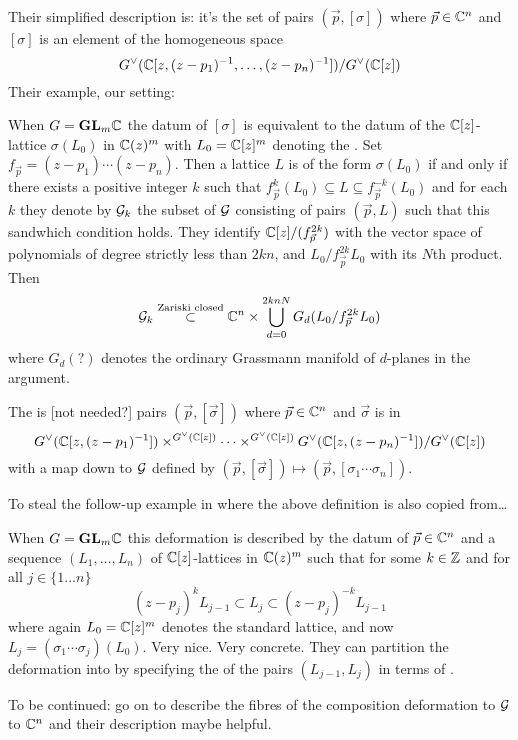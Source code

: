 \documentclass{article}
\begin{document}
Their simplified description is: it's the set of pairs $(\vec p,[\sigma])$ where $\vec p\in\mathbb C^n$ and $[\sigma]$ is an element of the homogeneous space 
\[
G^\vee(\mathbb C[z,(z-p_1)^{-1},\dots,(z-p_n)^{-1}])/G^\vee(\mathbb C[z])    
\]
Their example, our setting: 
\begin{example}
    When $G = {\mathbf{GL}}_m\mathbb C$ the datum of $[\sigma]$ is equivalent to the datum of the $\mathbb C[z]$-lattice $\sigma(L_0)$ in $\mathbb C(z)^m$ with $L_0 = \mathbb C[z]^m$ denoting the . Set $f_{\vec p} = (z - p_1)\cdots (z-p_n)$. Then a lattice $L$ is of the form $\sigma(L_0)$ if and only if there exists a positive integer $k$ such that $f^k_{\vec p}(L_0) \subseteq L\subseteq f^{-k}_{\vec p}(L_0)$ and for each $k$ they denote by $\mathcal G_k$ the subset of $\mathcal G$ consisting of pairs $(\vec p,L)$ such that this sandwhich condition holds. They identify $\mathbb C[z]/(f_{\vec p}^{2k})$ with the vector space of polynomials of degree strictly less than $2kn$, and $L_0/f_{\vec p}^{2k}L_0$ with its $N$th product. Then 
    \[
    \mathcal G_k \overset{\text{Zariski closed}}{\subset} \mathbb C^n\times\bigcup_{d=0}^{2knN} G_d(L_0/f_{\vec p}^{2k}L_0)  
    \]
    where $G_d(?)$ denotes the ordinary Grassmann manifold of $d$-planes in the argument.
\end{example}

\begin{definition}
    The  is [not needed?]
    pairs $(\vec p,[\vec\sigma])$ where $\vec p\in\mathbb C^n$ and $\vec\sigma$ is in 
    \[
    G^\vee(\mathbb C[z,(z-p_1)^{-1}]) \times^{G^\vee(\mathbb C[z])}\cdots\times^{G^\vee(\mathbb C[z])} G^\vee(\mathbb C[z,(z-p_n)^{-1}])/G^\vee(\mathbb C[z])
    \] with a map down to $\mathcal G$ defined by $(\vec p,[\vec \sigma])\mapsto (\vec p,[\sigma_1\cdots\sigma_n])$. 
\end{definition}
To steal the follow-up example in \cite{baumann2020bases} where the above definition is also copied from\dots 
\begin{example}
    When $G = {\mathbf{GL}}_m\mathbb C$ this deformation is described by the datum of $\vec p\in\mathbb C^n$ and a sequence $(L_1,\dots,L_n)$ of $\mathbb C[z]$-lattices in $\mathbb C(z)^m$ such that for some $k\in\mathbb Z$ and for all $j \in \{1\dots n\}$
    \[
    (z-p_j)^kL_{j-1}\subset L_j\subset (z-p_j)^{-k} L_{j-1}    
    \]
    where again $L_0 = \mathbb C[z]^m$ denotes the standard lattice, and now $L_j = (\sigma_1\cdots\sigma_j)(L_0)$. Very nice. Very concrete. They can partition the deformation into  by specifying the  of the pairs $(L_{j-1},L_j)$ in terms of . 
\end{example}
To be continued: \cite{baumann2020bases} go on to describe the fibres of the composition deformation to $\mathcal G$ to $\mathbb C^n$ and their description maybe helpful.
\end{document}
